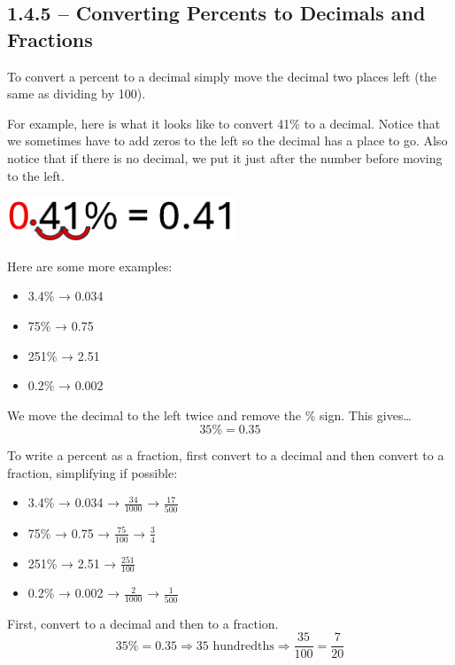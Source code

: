 \documentclass[
  letterpaper,
  DIV=11,
  numbers=noendperiod]{scrreprt}
\begin{document}
\subsection*{1.4.5 -- Converting Percents to Decimals and
Fractions}\label{converting-percents-to-decimals-and-fractions}

To convert a percent to a decimal simply move the decimal two places
left (the same as dividing by 100).

For example, here is what it looks like to convert 41\% to a decimal.
Notice that we sometimes have to add zeros to the left so the decimal
has a place to go. Also notice that if there is no decimal, we put it
just after the number before moving to the left.

\includegraphics[width=\linewidth,height=0.52083in,keepaspectratio]{images/Unit_1/Lesson_4/convert_41_percent.png}

Here are some more examples:

\begin{itemize}
\item
  3.4\% → 0.034
\item
  75\% → 0.75
\item
  251\% → 2.51
\item
  0.2\% → 0.002
\end{itemize}

We move the decimal to the left twice and remove the \% sign. This
gives\ldots{} \[
35\% = 0.35
\]

To write a percent as a fraction, first convert to a decimal and then
convert to a fraction, simplifying if possible:

\begin{itemize}
\item
  3.4\% → 0.034 → \(\frac{34}{1000}\) → \(\frac{17}{500}\)
\item
  75\% → 0.75 → \(\frac{75}{100}\) → \(\frac{3}{4}\)
\item
  251\% → 2.51 → \(\frac{251}{100}\)
\item
  0.2\% → 0.002 → \(\frac{2}{1000}\) → \(\frac{1}{500}\)
\end{itemize}

First, convert to a decimal and then to a fraction. \[
35\% = 0.35 \Rightarrow \text{35 hundredths} \Rightarrow \frac{35}{100} = \frac{7}{20}
\]
\end{document}
